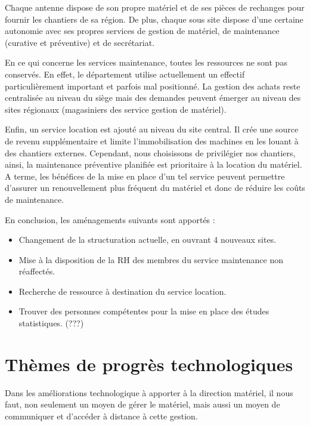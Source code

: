Chaque antenne dispose de son propre matériel et de ses pièces de rechanges pour fournir les chantiers de sa région.
De plus, chaque sous site dispose d’une certaine autonomie avec ses propres services de gestion de matériel, de maintenance (curative et préventive) et de secrétariat. 


En ce qui concerne les services maintenance, toutes les ressources ne sont pas conservés. En effet, le département
utilise actuellement un effectif particulièrement important et parfois mal positionné. 
La gestion des achats reste centralisée au niveau du siège mais des demandes peuvent émerger au niveau des sites régionaux (magasiniers des service gestion de matériel).


Enfin, un service location est ajouté au niveau du site central. Il crée une source de revenu supplémentaire et limite l’immobilisation des machines en les louant à des chantiers externes. Cependant, nous choisissons de privilégier nos chantiers, ainsi, la maintenance préventive planifiée est prioritaire à la location du matériel. A terme, les bénéfices de la mise en place d’un tel service peuvent permettre d’assurer un renouvellement plus fréquent du matériel et donc de réduire les coûts de maintenance.


En conclusion, les aménagements suivants sont apportés :
        \begin{itemize}
                \item Changement de la structuration actuelle, en ouvrant 4 nouveaux sites.
                \item Mise à la disposition de la RH des membres du service maintenance non réaffectés.
                \item Recherche de ressource à destination du service location.
                \item Trouver des personnes compétentes pour la mise en place des études statistiques. (???)
        \end{itemize} 

		

\section{Thèmes de progrès technologiques}

Dans les améliorations technologique à apporter à la direction matériel, il nous faut, non seulement un moyen de gérer le matériel, mais aussi un moyen de communiquer et d'accéder à distance à cette gestion.


